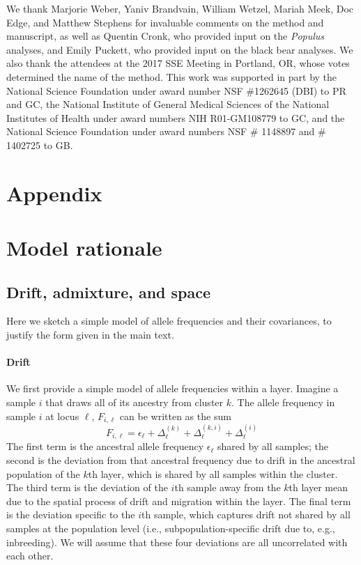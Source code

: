 \documentclass[12pt]{article}
\begin{document}
We thank Marjorie Weber, Yaniv Brandvain, William Wetzel, 
Mariah Meek, Doc Edge, and Matthew Stephens 
for invaluable comments on the method and manuscript, 
as well as Quentin Cronk, who provided input on the \textit{Populus} analyses, 
and Emily Puckett, who provided input on the black bear analyses.
We also thank the attendees at the 2017 SSE Meeting in Portland, OR, 
whose votes determined the name of the method.
This work was supported in part by 
the National Science Foundation under award number NSF \#1262645 (DBI) to PR and GC, 
the National Institute of General Medical Sciences of the National
Institutes of Health under award numbers NIH R01-GM108779 to GC,
and the National Science Foundation under award numbers NSF \# 1148897 and \# 1402725 to GB.

\newpage
\section*{Appendix}
\renewcommand{\theequation}{A\arabic{equation}}
\setcounter{equation}{0}
\renewcommand{\thetable}{A\arabic{table}}
\setcounter{table}{0}
\renewcommand{\thefigure}{A\arabic{figure}}
\setcounter{figure}{0}
\renewcommand{\thesection}{A\arabic{section}}
\setcounter{section}{0}


\section{Model rationale}
\subsection{Drift, admixture, and space} \label{rationale}
Here we sketch a simple model of allele frequencies and their
covariances, to justify the form given in the main text.
\paragraph{Drift} 
We first provide a simple model of allele frequencies within a layer. 
Imagine a sample $i$ that draws all of its ancestry from cluster $k$.
The allele frequency in sample $i$ at locus $\ell$, $F_{i,\ell}$ can be
written as the sum
\begin{equation}
F_{i,\ell} = \epsilon_{\ell} + \Delta^{(k)}_{\ell} +
\Delta^{(k,i)}_{\ell} + \Delta^{(i)}_{\ell}
\label{drift_terms_no_admix}
\end{equation}
The first term is the ancestral allele frequency $\epsilon_\ell$ shared by all samples; 
the second is the deviation from that ancestral frequency 
due to drift in the ancestral population of the $k$th layer,
which is shared by all samples within the cluster. 
The third term is the deviation of the $i$th sample away from the $k$th layer mean 
due to the spatial process of drift and migration within the layer.
The final term is the deviation specific to the $i$th sample,
which captures drift not shared by all samples at the population level
(i.e., subpopulation-specific drift due to, e.g., inbreeding). 
We will assume that these four deviations are all uncorrelated with each other.
\end{document}
